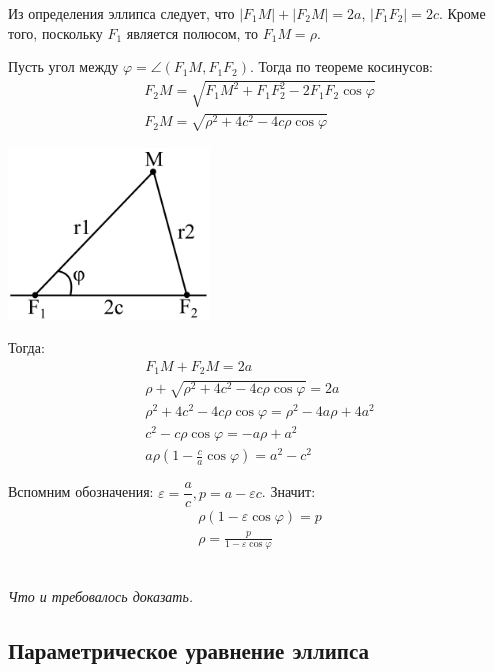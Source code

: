 \documentclass[a4paper,12pt,oneside]{extbook}
\newcommand{\newpar}{$ $\par\nobreak\ignorespaces}
\theoremstyle{numbered}
\theoremstyle{unnumbered}
\theoremstyle{named}
\theoremstyle{unnumbered}
\theoremstyle{named}
\theoremstyle{named}
\theoremstyle{named}
\renewenvironment{proof}[1][]{\breakenv[Доказательство]{\if\relax\detokenize{#1}\relax\else\;\fi}{\textbf{#1}}}{\smallskip\newpar \hfill\textit{Что и требовалось доказать.}}
\begin{document}
\begin{proof}
    Из определения эллипса следует, что \(|F_1 M| + |F_2 M| = 2a\), \(|F_1 F_2| = 2c\). Кроме того, поскольку \(F_1\) является полюсом, то \(F_1M = \rho\).

    Пусть угол между \(\varphi = \angle{(F_1M, F_1F_2)}\). Тогда по теореме косинусов:
    \begin{gather*}
        F_2 M = \sqrt{F_1M^2 + F_1F_2^2 - 2F_1F_2\cos{\varphi}} \\
        F_2 M = \sqrt{\rho^2 + 4c^2 - 4c\rho\cos{\varphi}}
    \end{gather*}

    \begin{center}
        \includegraphics[width=0.4\textwidth]{polar_cos.png}
    \end{center}

    Тогда:
    \begin{gather*}
        F_1M + F_2M = 2a \\
        \rho + \sqrt{\rho^2 + 4c^2 - 4c\rho\cos{\varphi}} = 2a \\
        \rho^2 + 4c^2 - 4c\rho\cos{\varphi} = \rho^2 - 4a\rho + 4a^2 \\
        c^2 - c\rho\cos{\varphi} = -a\rho + a^2 \\
        a\rho (1 - \frac{c}{a}\cos{\varphi}) = a^2 - c^2
    \end{gather*}

    Вспомним обозначения: \(\varepsilon = \dfrac{a}{c}, p = a - \varepsilon c\). Значит:
    \begin{gather*}
        \rho(1 - \varepsilon\cos{\varphi}) = p \\
        \rho = \frac{p}{1 - \varepsilon\cos{\varphi}}
    \end{gather*}
\end{proof}

\subsection{Параметрическое уравнение эллипса}%
\label{sub:Параметрическое уравнение эллипса}
\end{document}

